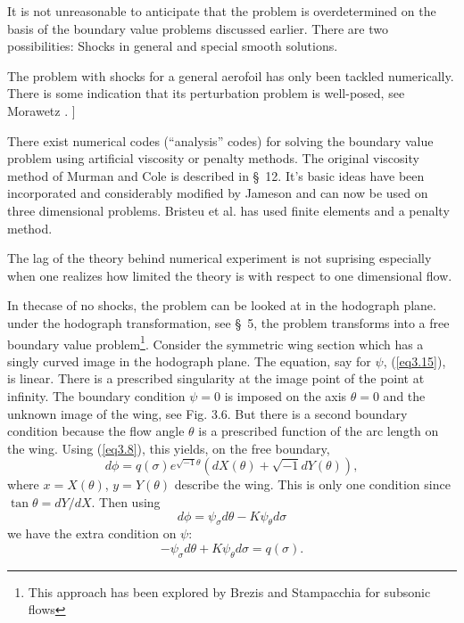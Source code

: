 It is not unreasonable to anticipate that the problem is overdetermined on the basis of the boundary value problems discussed earlier. There are two possibilities: Shocks in general and special smooth solutions.

The problem with shocks for a general aerofoil has only been tackled numerically. There is some indication that its perturbation problem is well-posed, see Morawetz \cite{key27}. ]

There exist numerical codes (``analysis'' codes) for solving the\break
boundary value problem using artificial viscosity or penalty
methods. The original viscosity method of Murman and Cole \cite{key32}
is described in \S\ 12. It's basic ideas have been incorporated and
considerably modified by Jameson \cite{key18} and can now be used on
three dimensional problems. Bristeu et al. \cite{key4} has used finite
elements and a penalty method.   

The lag of the theory behind numerical experiment is not suprising especially when one realizes how limited the theory is with respect to one dimensional flow.


In the\pageoriginale case of no shocks, the problem can be looked at in the hodograph plane. under the hodograph transformation, see \S\ 5, the problem transforms into a free boundary value problem\footnote{This approach has been explored by Brezis and Stampacchia \cite{key3} for subsonic flows}. Consider the symmetric wing section which has a singly curved image in the hodograph plane. The equation, say for $\psi$, (\ref{eq3.15}), is linear. There is a prescribed singularity at the image point of the point at infinity. The boundary condition $\psi=0$ is imposed on the axis $\theta = 0$ and the unknown image of the wing, see Fig. 3.6. But there is a second boundary condition because the flow angle $\theta$ is a prescribed function of the arc length on the wing. Using (\ref{eq3.8}), this yields, on the free boundary,
$$
d\phi = q(\sigma) e^{\sqrt{-1} \theta} (dX (\theta) + \sqrt{-1} dY (\theta)),
$$
where $x = X(\theta)$, $y = Y(\theta)$ describe the wing. This is only one condition since $\tan \theta = dY / dX$. Then using
$$
d\phi = \psi_\sigma d \theta - K \psi_\theta d \sigma
$$
we have the extra condition on $\psi$:
$$
-\psi_\sigma d \theta + K \psi_\theta d \sigma = q(\sigma).
$$

